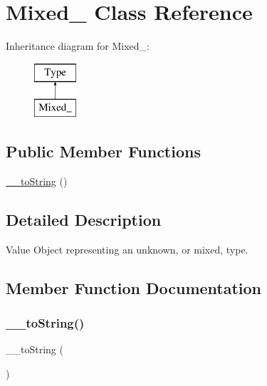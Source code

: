 \hypertarget{classphp_documentor_1_1_reflection_1_1_types_1_1_mixed__}{}\section{Mixed\+\_\+ Class Reference}
\label{classphp_documentor_1_1_reflection_1_1_types_1_1_mixed__}
Inheritance diagram for Mixed\+\_\+\+:\begin{figure}[H]
\begin{center}
\leavevmode
\includegraphics[height=2.000000cm]{classphp_documentor_1_1_reflection_1_1_types_1_1_mixed__}
\end{center}
\end{figure}
\subsection*{Public Member Functions}
\begin{DoxyCompactItemize}
\item 
\mbox{\hyperlink{classphp_documentor_1_1_reflection_1_1_types_1_1_mixed___a7516ca30af0db3cdbf9a7739b48ce91d}{\+\_\+\+\_\+to\+String}} ()
\end{DoxyCompactItemize}


\subsection{Detailed Description}
Value Object representing an unknown, or mixed, type. 

\subsection{Member Function Documentation}
\mbox{\label{classphp_documentor_1_1_reflection_1_1_types_1_1_mixed___a7516ca30af0db3cdbf9a7739b48ce91d}} 
\subsubsection{\texorpdfstring{\+\_\+\+\_\+to\+String()}{\_\_toString()}}
{\footnotesize\ttfamily \+\_\+\+\_\+to\+String (\begin{DoxyParamCaption}{ }\end{DoxyParamCaption})}

